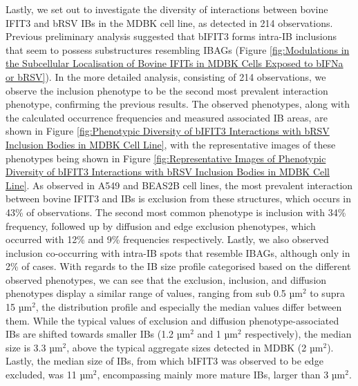 Lastly, we set out to investigate the diversity of interactions between bovine IFIT3 and bRSV IBs in the MDBK cell line, as detected in 214 observations. Previous preliminary analysis suggested that bIFIT3 forms intra-IB inclusions that seem to possess substructures resembling IBAGs (Figure \ref{fig:Modulations in the Subcellular Localisation of Bovine IFITs in MDBK Cells Exposed to bIFNa or bRSV}). In the more detailed analysis, consisting of 214 observations, we observe the inclusion phenotype to be the second most prevalent interaction phenotype, confirming the previous results. The observed phenotypes, along with the calculated occurrence frequencies and measured associated IB areas, are shown in Figure \ref{fig:Phenotypic Diversity of bIFIT3 Interactions with bRSV Inclusion Bodies in MDBK Cell Line}, with the representative images of these phenotypes being shown in Figure \ref{fig:Representative Images of Phenotypic Diversity of bIFIT3 Interactions with bRSV Inclusion Bodies in MDBK Cell Line}. As observed in A549 and BEAS2B cell lines, the most prevalent interaction between bovine IFIT3 and IBs is exclusion from these structures, which occurs in 43\% of observations. The second most common phenotype is inclusion with 34\% frequency, followed up by diffusion and edge exclusion phenotypes, which occurred with 12\% and 9\% frequencies respectively. Lastly, we also observed inclusion co-occurring with intra-IB spots that resemble IBAGs, although only in 2\% of cases. With regards to the IB size profile categorised based on the different observed phenotypes, we can see that the exclusion, inclusion, and diffusion phenotypes display a similar range of values, ranging from sub 0.5 \(\mbox{µm}^2\) to supra 15 \(\mbox{µm}^2\), the distribution profile and especially the median values differ between them. While the typical values of exclusion and diffusion phenotype-associated IBs are shifted towards smaller IBs (1.2 \(\mbox{µm}^2\) and 1 \(\mbox{µm}^2\) respectively), the median size is 3.3 \(\mbox{µm}^2\), above the typical aggregate sizes detected in MDBK (2 \(\mbox{µm}^2\)). Lastly, the median size of IBs, from which bIFIT3 was observed to be edge excluded, was 11 \(\mbox{µm}^2\), encompassing mainly more mature IBs, larger than 3 \(\mbox{µm}^2\).

